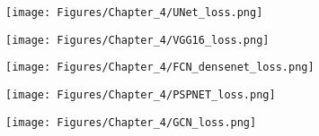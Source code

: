 \begin{figure} [h!]
	\centering
	\begin{subfigure}[b]{0.49\textwidth}
		\centering
		\texttt{[image: Figures/Chapter\_4/UNet\_loss.png]}
		\caption{}
		\label{fig:UNet_loss}
	\end{subfigure}
	\hfill
	\begin{subfigure}[b]{0.49\textwidth}
		\centering
		\texttt{[image: Figures/Chapter\_4/VGG16\_loss.png]}
		\caption{}
		\label{fig:VGG16_loss}
	\end{subfigure}
	\hfill
	\begin{subfigure}[b]{0.49\textwidth}
		\centering
		\texttt{[image: Figures/Chapter\_4/FCN\_densenet\_loss.png]}
		\caption{}
		\label{fig:FCN_densenet_loss}
	\end{subfigure}	
	\hfill
	\begin{subfigure}[b]{0.49\textwidth}
		\centering
		\texttt{[image: Figures/Chapter\_4/PSPNET\_loss.png]}
		\caption{}
		\label{fig:PSPNet_loss}
	\end{subfigure}
	\begin{subfigure}[b]{0.49\textwidth}
		\centering
		\texttt{[image: Figures/Chapter\_4/GCN\_loss.png]}
		\caption{}
		\label{fig:GCN_loss}
	\end{subfigure}
	\caption{}
	\label{fig:FCN_model_convergence}
\end{figure} 
\clearpage
